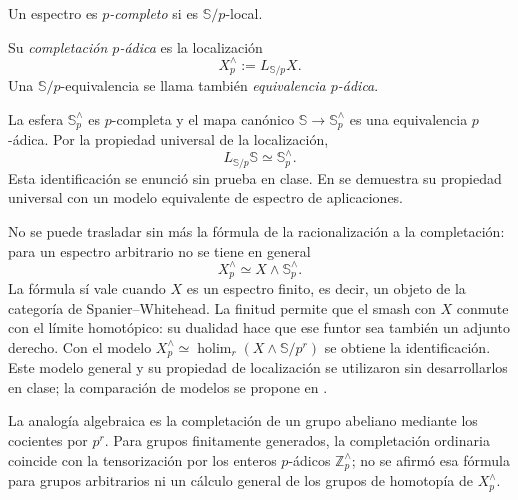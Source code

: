 \begin{defi}
Un espectro es \emph{$p$-completo} si es $\mathbb S/p$-local.

Su \emph{completación $p$-ádica} es la localización
\[
X_p^{\wedge}:=L_{\mathbb S/p}X.
\]
Una $\mathbb S/p$-equivalencia se llama también \emph{equivalencia $p$-ádica}.
\end{defi}

La esfera $\mathbb S_p^{\wedge}$ es $p$-completa y el mapa canónico $\mathbb S\to\mathbb S_p^{\wedge}$ es una equivalencia $p$-ádica. Por la propiedad universal de la localización,
\[
L_{\mathbb S/p}\mathbb S\simeq\mathbb S_p^{\wedge}.
\]
Esta identificación se enunció sin prueba en clase. En \cite[lema~A.2.2.5]{malkiewich} se demuestra su propiedad universal con un modelo equivalente de espectro de aplicaciones.

No se puede trasladar sin más la fórmula de la racionalización a la completación: para un espectro arbitrario no se tiene en general
\[
X_p^{\wedge}\simeq X\wedge\mathbb S_p^{\wedge}.
\]
La fórmula sí vale cuando $X$ es un espectro finito, es decir, un objeto de la categoría de Spanier--Whitehead. La finitud permite que el smash con $X$ conmute con el límite homotópico: su dualidad hace que ese funtor sea también un adjunto derecho. Con el modelo $X_p^{\wedge}\simeq\operatorname*{holim}_r(X\wedge\mathbb S/p^r)$ se obtiene la identificación. Este modelo general y su propiedad de localización se utilizaron sin desarrollarlos en clase; la comparación de modelos se propone en \cite[ejercicio~4.4.30]{malkiewich}.

La analogía algebraica es la completación de un grupo abeliano mediante los cocientes por $p^r$. Para grupos finitamente generados, la completación ordinaria coincide con la tensorización por los enteros $p$-ádicos $\mathbb Z_p^{\wedge}$; no se afirmó esa fórmula para grupos arbitrarios ni un cálculo general de los grupos de homotopía de $X_p^{\wedge}$.

